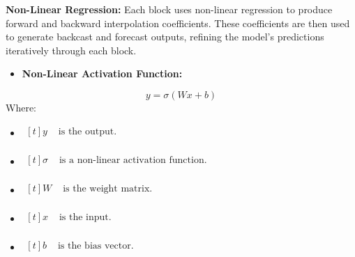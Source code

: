 \documentclass{ieeeojies}
\begin{document}
\textbf{Non-Linear Regression:} Each block uses non-linear regression to produce forward and backward interpolation coefficients. These coefficients are then used to generate backcast and forecast outputs, refining the model’s predictions iteratively through each block.

\begin{itemize}
    \item  \textbf{Non-Linear Activation Function:} 
\end{itemize}
\begin{equation}
y = \sigma(Wx + b)
\end{equation}
Where: 
\begin{itemize}
    \item $\begin{aligned}[t]
            y & \text{ is the output.} \\
            \end{aligned}$
    \item $\begin{aligned}[t]
            \sigma & \text{ is a non-linear activation function.} \\
            \end{aligned}$
    \item $\begin{aligned}[t]
            W & \text{ is the weight matrix.} \\
            \end{aligned}$
    \item $\begin{aligned}[t]
            x & \text{ is the input.} \\
            \end{aligned}$
    \item $\begin{aligned}[t]
            b & \text{ is the bias vector.} \\
            \end{aligned}$
\end{itemize}
\end{document}
